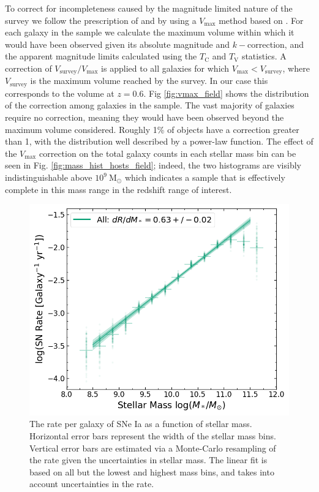 \documentclass[fleqn,usenatbib]{mnras}
\begin{document}
To correct for incompleteness caused by the magnitude limited nature of the survey we follow the prescription of \citet{Sullivan2006} and \citet{Smith2012} by using a $V_{\mathrm{max}}$ method based on \citet{Schmidt1968}. For each galaxy in the sample we calculate the maximum volume within which it would have been observed given its absolute magnitude and $k-$correction, and the apparent magnitude limits calculated using the $T_{\mathrm{C}}$ and $T_{\mathrm{V}}$ statistics. A correction of $V_{\mathrm{survey}}/V_{\mathrm{max}}$ is applied to all galaxies for which $V_{\mathrm{max}} < V_{\mathrm{survey}}$, where $V_{\mathrm{survey}}$ is the maximum volume reached by the survey. In our case this corresponds to the volume at $z=0.6$. Fig \ref{fig:vmax_field} shows the distribution of the correction among galaxies in the sample. The vast majority of galaxies require no correction, meaning they would have been observed beyond the maximum volume considered. Roughly 1\% of objects have a correction greater than 1, with the distribution well described by a power-law function. The effect of the $V_{\mathrm{max}}$ correction on the total galaxy counts in each stellar mass bin can be seen in Fig. \ref{fig:mass_hist_hosts_field}; indeed, the two histograms are visibly indistinguishable above $10^9~\mathrm{M}_{\odot}$ which indicates a sample that is effectively complete in this mass range in the redshift range of interest.



\begin{figure}
    \centering
    \includegraphics[width=.5\textwidth]{figs/rate_vs_mass_all.png}
    \caption{The rate per galaxy of SNe Ia as a function of stellar mass. Horizontal error bars represent the width of the stellar mass bins. Vertical error bars are estimated via a Monte-Carlo resampling of the rate given the uncertainties in stellar mass. The linear fit is based on all but the lowest and highest mass bins, and takes into account uncertainties in the rate.}%
    \label{fig:rate_raw}
\end{figure}
\end{document}
